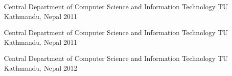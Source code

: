 



\begin{cvhonors}

  \cvhonor    
    {Central Department of Computer Science and Information Technology} %
    {TU} %
    {Kathmandu, Nepal} %
    {2011} %


\end{cvhonors}



\begin{cvhonors}

  \cvhonor    
    {Central Department of Computer Science and Information Technology} %
    {TU} %
    {Kathmandu, Nepal} %
    {2011} %


\end{cvhonors}


\begin{cvhonors}

  \cvhonor    
    {Central Department of Computer Science and Information Technology} %
    {TU} %
    {Kathmandu, Nepal} %
    {2012} %


\end{cvhonors}



